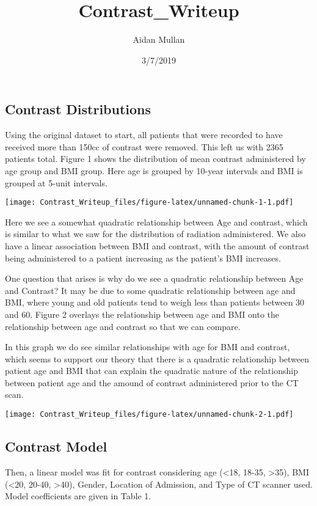 \documentclass[]{article}
\title{Contrast\_Writeup}
\author{Aidan Mullan}
\date{3/7/2019}
\begin{document}
\maketitle

\subsection{Contrast Distributions}\label{contrast-distributions}

Using the original dataset to start, all patients that were recorded to
have received more than 150cc of contrast were removed. This left us
with 2365 patients total. Figure 1 shows the distribution of mean
contrast administered by age group and BMI group. Here age is grouped by
10-year intervals and BMI is grouped at 5-unit intervals.

\texttt{[image: Contrast\_Writeup\_files/figure-latex/unnamed-chunk-1-1.pdf]}

Here we see a somewhat quadratic relationship between Age and contrast,
which is similar to what we saw for the distribution of radiation
administered. We also have a linear association between BMI and
contrast, with the amount of contrast being administered to a patient
increasing as the patient's BMI increases.

One question that arises is why do we see a quadratic relationship
between Age and Contrast? It may be due to some quadratic relationship
between age and BMI, where young and old patients tend to weigh less
than patients between 30 and 60. Figure 2 overlays the relationship
between age and BMI onto the relationship between age and contrast so
that we can compare.

In this graph we do see similar relationships with age for BMI and
contrast, which seems to support our theory that there is a quadratic
relationship between patient age and BMI that can explain the quadratic
nature of the relationship between patient age and the amound of
contrast administered prior to the CT scan.

\texttt{[image: Contrast\_Writeup\_files/figure-latex/unnamed-chunk-2-1.pdf]}

\subsection{Contrast Model}\label{contrast-model}

Then, a linear model was fit for contrast considering age
(\textless{}18, 18-35, \textgreater{}35), BMI (\textless{}20, 20-40,
\textgreater{}40), Gender, Location of Admission, and Type of CT scanner
used. Model coefficients are given in Table 1.
\end{document}
